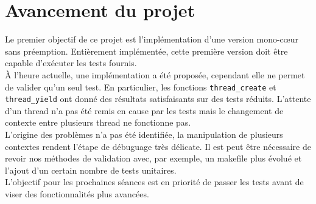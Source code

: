 \section*{Avancement du projet}

Le premier objectif de ce projet est l'implémentation d'une version mono-c\oe{}ur sans préemption. Entièrement implémentée, cette première version doit être capable d'exécuter les tests fournis.
\\

\`{A} l'heure actuelle, une implémentation a été proposée, cependant elle ne permet de valider qu'un seul test. En particulier, les fonctions \texttt{thread\_create} et \texttt{thread\_yield} ont donné des résultats satisfaisants sur des tests réduits. L'attente d'un thread n'a pas été remis en cause par les tests mais le changement de contexte entre plusieurs thread ne fonctionne pas.
\\

L'origine des problèmes n'a pas été identifiée, la manipulation de plusieurs contextes rendent l'étape de débuguage très délicate. Il est peut être nécessaire de revoir nos méthodes de validation avec, par exemple, un makefile plus évolué et l'ajout d'un certain nombre de tests unitaires.
\\

L'objectif pour les prochaines séances est en priorité de passer les tests avant de viser des fonctionnalités plus avancées.
\\